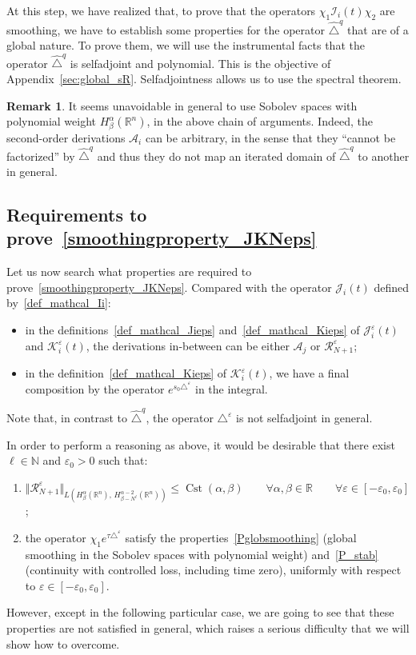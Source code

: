 \documentclass[10pt]{amsart}
\theoremstyle{definition}\newtheorem{defi}[theo]{Definition}\newtheorem{rema}[theo]{Remark}\newtheorem{exam}[theo]{Example}\newtheorem{exem}[theo]{Example}\newtheorem{nota}[theo]{Notation}
\newcommand*\R{\mathbb{R}}
\newcommand*\N{\mathbb{N}}
\newcommand{\calK}{\mathcal{K}}
\newcommand{\calA}{\mathcal{A}}
\newcommand{\calR}{\mathcal{R}}
\newcommand{\calI}{\mathcal{I}}
\newcommand{\calJ}{\mathcal{J}}
\DeclareMathOperator{\Cst}{Cst}
\renewcommand{\leq}{\leqslant}
\newcommand*{\romanenumi}{\renewcommand*{\theenumi}{\roman{enumi}}}
\let\oldforall\forall
\renewcommand*{\forall}{\mathrel{\oldforall}}
\begin{document}
At this step, we have realized that, to prove that the operators $\chi_1\calI_i(t)\chi_2$ are smoothing, we have to establish some properties for the operator $\widehat{\triangle}^q$ that are of a global nature. To prove them, we will use the instrumental facts that the operator $\widehat{\triangle}^q$ is selfadjoint and polynomial. This is the objective of Appendix~\ref{sec:global_sR}. Selfadjointness allows us to use the spectral theorem.

\begin{rema}
It seems unavoidable in general to use Sobolev spaces with polynomial weight $H^\alpha_\beta(\R^n)$, in the above chain of arguments. Indeed, the second-order derivations $\calA_i$ can be arbitrary, in the sense that they ``cannot be factorized'' by $\widehat{\triangle}^{q}$ and thus they do not map an iterated domain of $\widehat{\triangle}^{q}$ to another in general.
\end{rema}


\subsection{Requirements to prove~\eqref{smoothingproperty_JKNeps}}\label{sec_idea_eps}
Let us now search what properties are required to prove~\eqref{smoothingproperty_JKNeps}. Compared with the operator $\calJ_i(t)$ defined by~\eqref{def_mathcal_Ii}:
\begin{itemize}
\item in the definitions~\eqref{def_mathcal_Jieps} and~\eqref{def_mathcal_Kieps} of $\calJ_i^\varepsilon(t)$ and $\calK_i^\varepsilon(t)$, the derivations in-between can be either $\calA_j$ or $\calR_{N+1}^\varepsilon$;
\item in the definition~\eqref{def_mathcal_Kieps} of $\calK_i^\varepsilon(t)$, we have a final composition by the operator $e^{s_0\triangle^\varepsilon}$ in the integral.
\end{itemize}
Note that, in contrast to $\widehat{\triangle}^q$, the operator $\triangle^\varepsilon$ is not selfadjoint in general.

In order to perform a reasoning as above, it would be desirable that there exist $\ell\in\N$ and $\varepsilon_0>0$ such that:
\begin{enumerate}\romanenumi
\item\label{desirable_i}
$\Vert \calR_{N+1}^\varepsilon\Vert_{L(H^\alpha_\beta(\R^n),\,H^{\alpha-2}_{\beta-N^\ell}(\R^n))} \leq \Cst(\alpha,\beta) \qquad \forall\alpha,\beta\in\R \qquad \forall\varepsilon\in[-\varepsilon_0,\varepsilon_0]$;
\item\label{desirable_ii}
the operator $\chi_1 e^{\tau\triangle^\varepsilon}$ satisfy the properties~\eqref{Pglobsmoothing} (global smoothing in the Sobolev spaces with polynomial weight) and~\eqref{P_stab} (continuity with controlled loss, including time zero), uniformly with respect to $\varepsilon\in[-\varepsilon_0,\varepsilon_0]$.
\end{enumerate}
However, except in the following particular case, we are going to see that these properties are not satisfied in general, which raises a serious difficulty that we will show how to overcome.
\end{document}
